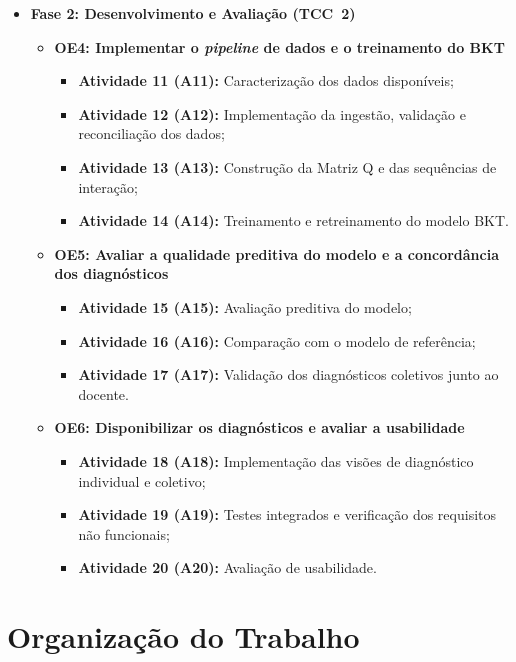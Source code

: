 \begin{itemize}
    \item \textbf{Fase 2: Desenvolvimento e Avaliação (TCC~2)}
    \begin{itemize}
        \item \textbf{OE4: Implementar o \textit{pipeline} de dados e o treinamento do BKT}
        \begin{itemize}
            \item \textbf{Atividade 11 (A11):} Caracterização dos dados disponíveis;
            \item \textbf{Atividade 12 (A12):} Implementação da ingestão, validação e reconciliação dos dados;
            \item \textbf{Atividade 13 (A13):} Construção da Matriz Q e das sequências de interação;
            \item \textbf{Atividade 14 (A14):} Treinamento e retreinamento do modelo BKT.
        \end{itemize}
        \item \textbf{OE5: Avaliar a qualidade preditiva do modelo e a concordância dos diagnósticos}
        \begin{itemize}
            \item \textbf{Atividade 15 (A15):} Avaliação preditiva do modelo;
            \item \textbf{Atividade 16 (A16):} Comparação com o modelo de referência;
            \item \textbf{Atividade 17 (A17):} Validação dos diagnósticos coletivos junto ao docente.
        \end{itemize}
        \item \textbf{OE6: Disponibilizar os diagnósticos e avaliar a usabilidade}
        \begin{itemize}
            \item \textbf{Atividade 18 (A18):} Implementação das visões de diagnóstico individual e coletivo;
            \item \textbf{Atividade 19 (A19):} Testes integrados e verificação dos requisitos não funcionais;
            \item \textbf{Atividade 20 (A20):} Avaliação de usabilidade.
        \end{itemize}
    \end{itemize}
\end{itemize}

\section{Organização do Trabalho}
\label{sec:organizacao}

